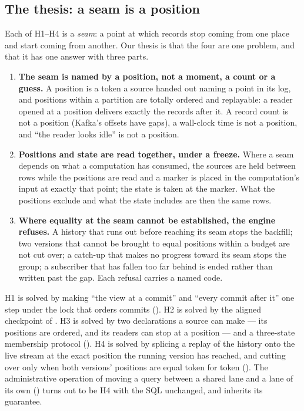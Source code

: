 \documentclass[11pt,a4paper]{article}
\renewcommand{\_}{\oldunderscore\allowbreak}
\newcommand{\defn}[1]{\emph{#1}}
\begin{document}
\subsection{The thesis: a seam is a position}

Each of H1--H4 is a \defn{seam}: a point at which records stop coming from one place and start
coming from another. Our thesis is that the four are one problem, and that it has one answer with
three parts.

\begin{enumerate}[leftmargin=*,itemsep=3pt]
\item \textbf{The seam is named by a position, not a moment, a count or a guess.} A position is a
      token a source handed out naming a point in its log, and positions within a partition are
      totally ordered and replayable: a reader opened at a position delivers exactly the records after
      it. A record count is not a position (Kafka's offsets have gaps), a wall-clock time is not a
      position, and ``the reader looks idle'' is not a position.
\item \textbf{Positions and state are read together, under a freeze.} Where a seam depends on what
      a computation has consumed, the sources are held between rows while the positions are read and
      a marker is placed in the computation's input at exactly that point; the state is taken at the
      marker. What the positions exclude and what the state includes are then the same rows.
\item \textbf{Where equality at the seam cannot be established, the engine refuses.} A history
      that runs out before reaching its seam stops the backfill; two versions that cannot be brought
      to equal positions within a budget are not cut over; a catch-up that makes no progress toward
      its seam stops the group; a subscriber that has fallen too far behind is ended rather than
      written past the gap. Each refusal carries a named code.
\end{enumerate}

H1 is solved by making ``the view at a commit'' and ``every commit after it'' one step under the
lock that orders commits (). H2 is solved by the aligned checkpoint of
. H3 is solved by two declarations a source can make --- its positions are
ordered, and its readers can stop at a position --- and a three-state membership protocol
(). H4 is solved by splicing a replay of the history onto the live stream at the exact
position the running version has reached, and cutting over only when both versions' positions are
equal token for token (). The administrative operation of moving a query between a
shared lane and a lane of its own () turns out to be H4 with the SQL unchanged, and
inherits its guarantee.
\end{document}
